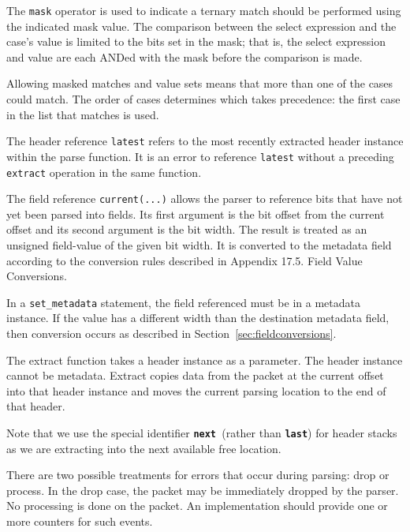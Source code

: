 \documentclass[12pt]{article}
\begin{document}
The \texttt{mask} operator is used to indicate a ternary match should be performed 
using the indicated mask value. The comparison between the select expression 
and the case's value is limited to the bits set in the mask; that is, the 
select expression and value are each ANDed with the mask before the comparison 
is made. 

Allowing masked matches and value sets means that more than one of the cases 
could match. The order of cases determines which takes precedence: the first 
case in the list that matches is used.

The header reference \texttt{latest} refers to the most recently extracted header 
instance within the parse function.  It is an error to reference \texttt{latest} without 
a preceding \texttt{extract} operation in the same function.

The field reference \texttt{current(...)} allows the parser to reference bits that 
have not yet been parsed into fields. Its first argument is the bit offset 
from the current offset and its second argument is the bit width.  The result 
is treated as an unsigned field-value of the given bit width. It is converted 
to the metadata field according to the conversion rules described in Appendix 
17.5. Field Value Conversions.

In a \texttt{set_metadata} statement, the field referenced must be in a metadata 
instance. If the value has a different width than the destination metadata 
field, then conversion occurs as described in Section~\ref{sec:fieldconversions}.


The extract function takes a header instance as a parameter.  The header instance 
cannot be metadata. Extract copies data from the packet at the current offset 
into that header instance and moves the current parsing location to the end 
of that header.

Note that we use the special identifier \texttt{\textbf{next} }(rather than \texttt{\textbf{last}}) for header 
stacks as we are extracting into the next available free location. 


There are two possible treatments for errors that occur during parsing: drop 
or process. In the drop case, the packet may be immediately dropped by the 
parser. No \matchaction processing is done on the packet. An implementation 
should provide one or more counters for such events.
\end{document}
